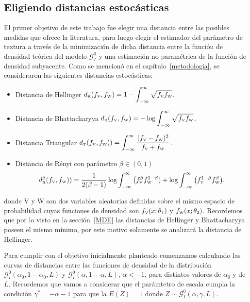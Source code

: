 \subsection{Eligiendo distancias estocásticas}
\label{EligiendoDistancias}

El primer objetivo de este trabajo fue elegir una distancia entre las posibles medidas que ofrece la literatura, para luego elegir el estimador del parámetro de textura a través de la minimización de dicha distancia entre la función de densidad teórica del modelo $\mathcal{G}_I^0$ y una estimación no paramétrica de la función de densidad subyacente. Como se mencionó en el capítulo~\ref{metodologia}, se consideraron las siguientes distancias estocásticas:

\begin{itemize}
	\label{dist}
	\item Distancia de Hellinger $d_\text{\tiny H}(f_\text{\tiny V},f_\text{\tiny W})=1-\displaystyle{\int_{-\infty}^{\infty}\sqrt{f_\text{\tiny V} f_\text{\tiny W}}}$.
	
	\item Distancia de Bhattacharyya $d_\text{\tiny B}(f_\text{\tiny V},f_\text{\tiny W})=-\log\displaystyle{\int_{-\infty}^{\infty}\sqrt{f_\text{\tiny V} f_\text{\tiny W}}}$.
	
	\item Distancia Triangular $d_\text{\tiny T}(f_\text{\tiny V},f_\text{\tiny W}))=\displaystyle{\int_{-\infty}^{\infty}\frac{(f_\text{\tiny V}-f_\text{\tiny W})^2}{f_\text{\tiny V}+f_\text{\tiny W}}}$.
	
	\item Distancia de R\'enyi con parámetro $\beta\in(0,1)$
	$$
	d_\text{\tiny R}^{\beta}(f_\text{\tiny V},f_\text{\tiny W}))=\frac{1}{2(\beta-1)}\log\displaystyle{\int_{-\infty}^{\infty}\big({f_\text{\tiny V}^{\beta}f_\text{\tiny W}^{1-\beta})}+\log\displaystyle{\int_{-\infty}^{\infty}\big(f_\text{\tiny V}^{1-\beta}f_\text{\tiny W}^{\beta}}}\big).
	$$
\end{itemize}
donde V y W son  dos variables aleatorias definidas sobre el mismo espacio de probabilidad cuyas funciones de densidad son $f_\text{\tiny V}(x;\theta_1)$ y $f_\text{\tiny W}(x;\theta_2)$. 
Recordemos que por lo visto en la sección~\ref{MDE} las distancias de Hellinger y Bhattacharyya poseen el mismo mínimo, por este motivo solamente se analizará la distancia de Hellinger.  

Para cumplir con el objetivo inicialmente planteado comenzamos calculando las curvas de distancias entre las funciones de densidad de la distribución $\mathcal G_I^0(\alpha_0, 1-\alpha_0, L)$ y $\mathcal G_I^0(\alpha,1-\alpha,L)$, $\alpha<-1$, para distintos valores de $\alpha_0$ y de $L$. Recordemos que vamos a considerar que el parámtetro de escala cumpla la condición $\gamma^*=-\alpha-1$ para que la $E(Z)=1$ donde $Z \sim \mathcal{G}_I^0(\alpha,\gamma,L)$.

